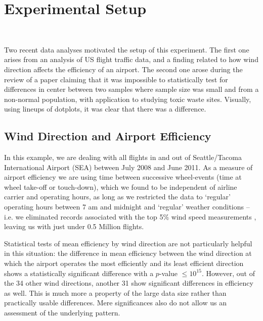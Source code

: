 \section{Experimental Setup}~\label{experimentone}

Two recent data analyses motivated the setup of this experiment. The
first one arises from an analysis of US flight traffic data, and a
finding related to how wind direction affects the efficiency of an
airport.  The second one arose during the review of a paper claiming
that it was impossible to statistically test for differences in center
between two samples where sample size was small and from a non-normal
population, with application to studying toxic waste sites. Visually,
using lineups of dotplots, it was clear that there was a difference.


\subsection{Wind Direction and Airport Efficiency}
In this example, we are dealing with all flights \cite{rita} in and out of Seattle/Tacoma International Airport (SEA) between July 2008 and June 2011. As a measure of airport efficiency we are using time between successive wheel-events (time at wheel take-off or touch-down), which we found to be independent of airline carrier and operating hours, as long as we restricted the data to `regular' operating hours between 7 am and midnight and `regular' weather conditions -- i.e. we eliminated records associated with the top 5\% wind speed measurements \cite{noaa-weather}, leaving us with just under 0.5 Million flights.

Statistical tests of mean efficiency by wind direction are not particularly helpful in this situation:
the difference in mean efficiency between the  wind direction at which the airport operates the most efficiently and its least efficient direction shows a statistically significant difference with a $p$-value $\le 10^{15}$. %
However, out of the 34 other wind directions,  another 31 show significant differences in efficiency as well. This is much more a property of the large data size rather than practically usable differences. Mere significances also do not allow us an assessment of the underlying pattern.

